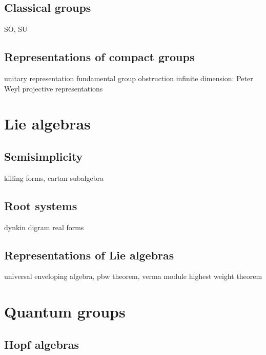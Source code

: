 \documentclass{../note}
\begin{document}
\chapter{Classical groups}
SO, SU
\chapter{Representations of compact groups}
unitary representation
fundamental group obstruction
infinite dimension: Peter Weyl
projective representations




\part{Lie algebras}
\chapter{Semisimplicity}
killing forms, cartan subalgebra
\chapter{Root systems}
dynkin digram
real forms
\chapter{Representations of Lie algebras}
universal enveloping algebra, pbw theorem, verma module
highest weight theorem



\part{Quantum groups}
\chapter{Hopf algebras}
\chapter{}
\end{document}
